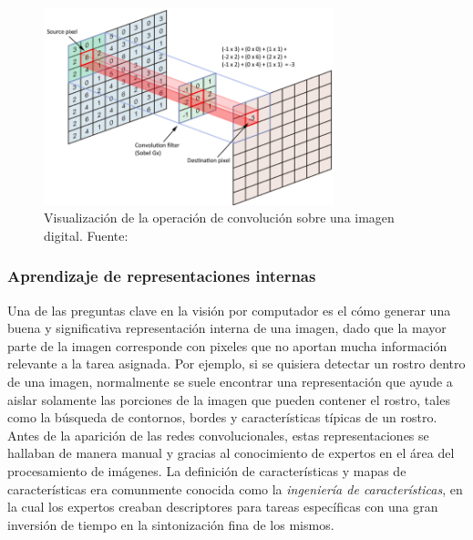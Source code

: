         \begin{figure}[!h] 
            \centering
            \includegraphics[width=0.75\textwidth]{img/convolucion}
            \caption[Visualización de la operación de convolución sobre una imagen digital]{Visualización de la operación de convolución sobre una imagen digital. Fuente: \cite{cornelisse_2018} }
            \label{fig:convolucion}
        \end{figure}


        \subsubsection{Aprendizaje de representaciones internas}
        Una de las preguntas clave en la visión por computador es el cómo generar una buena y significativa
        representación interna de una imagen, dado que la mayor parte de la imagen corresponde con pixeles que no 
        aportan mucha información relevante a la tarea asignada. Por ejemplo, si se quisiera detectar 
        un rostro dentro de una imagen, normalmente se suele encontrar una representación que ayude a aislar solamente 
        las porciones de la imagen que pueden contener el rostro, tales como la búsqueda de contornos, bordes y 
        características típicas de un rostro. Antes de la aparición de las redes convolucionales, estas representaciones 
        se hallaban de manera manual y gracias al conocimiento de expertos en el área del procesamiento de imágenes. 
        La definición de características y mapas de características era comunmente conocida como la 
        \textit{ingeniería de características}, en la cual los expertos creaban descriptores para tareas específicas con 
        una gran inversión de tiempo en la sintonización fina de los mismos. 


